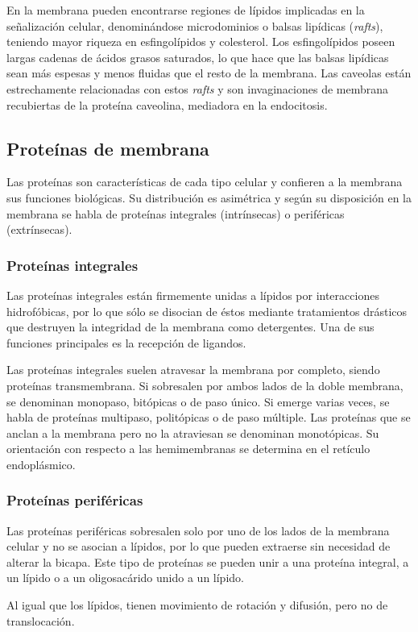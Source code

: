 En la membrana pueden encontrarse regiones de lípidos implicadas en la señalización celular, denominándose microdominios o balsas lipídicas (\textit{rafts}), teniendo mayor riqueza en esfingolípidos y colesterol. Los esfingolípidos poseen largas cadenas de ácidos grasos saturados, lo que hace que las balsas lipídicas sean más espesas y menos fluidas que el resto de la membrana. Las caveolas están estrechamente relacionadas con estos \textit{rafts} y son invaginaciones de membrana recubiertas de la proteína caveolina, mediadora en la endocitosis.
\subsection{Proteínas de membrana}
Las proteínas son características de cada tipo celular y confieren a la membrana sus funciones biológicas. Su distribución es asimétrica y según su disposición en la membrana se habla de proteínas integrales (intrínsecas) o periféricas (extrínsecas).
\subsubsection{Proteínas integrales}
Las proteínas integrales están firmemente unidas a lípidos por interacciones hidrofóbicas, por lo que sólo se disocian de éstos mediante tratamientos drásticos que destruyen la integridad de la membrana como detergentes. Una de sus funciones principales es la recepción de ligandos.

Las proteínas integrales suelen atravesar la membrana por completo, siendo proteínas transmembrana. Si sobresalen por ambos lados de la doble membrana, se denominan monopaso, bitópicas o de paso único. Si emerge varias veces, se habla de proteínas multipaso, politópicas o de paso múltiple. Las proteínas que se anclan a la membrana pero no la atraviesan se denominan monotópicas. Su orientación con respecto a las hemimembranas  se determina en el retículo endoplásmico.
\subsubsection{Proteínas periféricas}
Las proteínas periféricas sobresalen solo por uno de los lados de la membrana celular y no se asocian a lípidos, por lo que pueden extraerse sin necesidad de alterar la bicapa. Este tipo de proteínas se pueden unir a una proteína integral, a un lípido o a un oligosacárido unido a un lípido.

Al igual que los lípidos, tienen movimiento de rotación y difusión, pero no de translocación.
